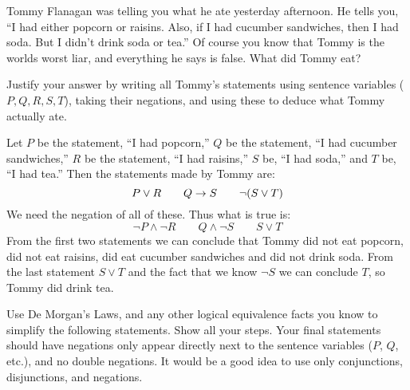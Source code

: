 \documentclass[10pt]{exam}
\begin{document}

\begin{questions}
  \question[4] Tommy Flanagan was telling you what he ate yesterday afternoon.  He tells you, ``I had either popcorn or raisins.  Also, if I had cucumber sandwiches, then I had soda.  But I didn't drink soda or tea.''  Of course you know that Tommy is the worlds worst liar, and everything he says is false.  What did Tommy eat?

  Justify your answer by writing all Tommy's statements using sentence variables ($P, Q, R, S, T$), taking their negations, and using these to deduce what Tommy actually ate.

  \begin{solution}
  Let $P$ be the statement, ``I had popcorn,'' $Q$ be the statement, ``I had cucumber sandwiches,'' $R$ be the statement, ``I had raisins,'' $S$ be, ``I had soda,'' and $T$ be, ``I had tea.''  Then the statements made by Tommy are:
  \[P \vee R \qquad Q \rightarrow S \qquad \neg(S \vee T)\]
  We need the negation of all of these.  Thus what is true is:
  \[\neg P \wedge \neg R \qquad Q \wedge \neg S \qquad S \vee T\]
  From the first two statements we can conclude that Tommy did not eat popcorn, did not eat raisins, did eat cucumber sandwiches and did not drink soda.  From the last statement $S \vee T$ and the fact that we know $\neg S$ we can conclude $T$, so Tommy did drink tea.
  \end{solution}





  \question[8] Use De Morgan's Laws, and any other logical equivalence facts you know to simplify the following statements.  Show all your steps.  Your final statements should have negations only appear directly next to the sentence variables ($P$, $Q$, etc.), and no double negations.  It would be a good idea to use only conjunctions, disjunctions, and negations.
\end{questions}
\end{document}
